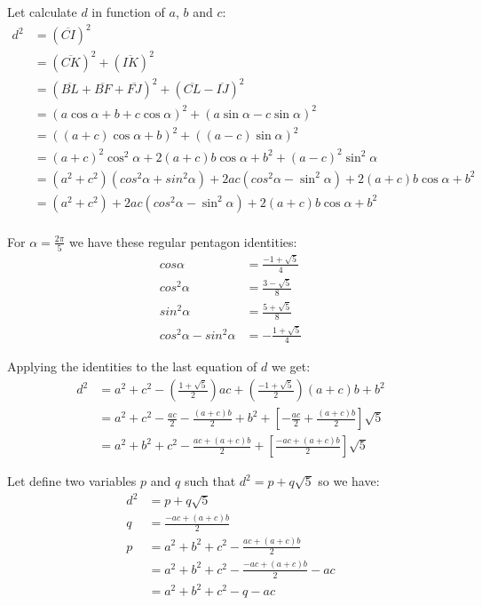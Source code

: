 \documentclass[11pt]{article}
\begin{document}
Let calculate $d$ in function of $a$, $b$ and $c$:
\begin{align*}
d^2 &= (\overline{CI})^2\\
    &= (\overline{CK})^2 + (\overline{IK})^2\\
    &= (\overline{BL} + \overline{BF} + \overline{FJ})^2 + (\overline{CL} - \overline{IJ})^2\\
    &= (a\cos{\alpha} + b + c\cos{\alpha})^2 + (a\sin{\alpha} - c\sin{\alpha})^2\\
    &= ((a+c)\cos{\alpha} + b)^2 + ((a-c)\sin{\alpha})^2\\
    &= (a+c)^2\cos^2{\alpha} + 2(a+c)b\cos{\alpha} + b^2 + (a-c)^2\sin^2{\alpha}\\
    &= (a^2+c^2)(cos^2{\alpha}+sin^2{\alpha}) + 2ac(cos^2{\alpha}-\sin^2{\alpha})+ 2(a+c)b\cos{\alpha} + b^2\\
    &= (a^2+c^2) + 2ac(cos^2{\alpha}-\sin^2{\alpha})+ 2(a+c)b\cos{\alpha} + b^2\\
\end{align*}

For $\alpha = \frac{2\pi}{5}$ we have these regular pentagon identities:
\begin{align*}
cos{\alpha}   &= \frac{-1 + \sqrt{5}}{4} \\
cos^2{\alpha} &= \frac{{ 3 - \sqrt{5}}}{8} \\
sin^2{\alpha} &= \frac{5 + \sqrt{5}}{8} \\
cos^2{\alpha} - sin^2{\alpha} &= -\frac{1 + \sqrt{5}}{4}
\end{align*}

Applying the identities to the last equation of $d$ we get:
\begin{align*}
d^2 &= a^2 + c^2 - (\frac{1 + \sqrt{5}}{2})ac + (\frac{-1 + \sqrt{5}}{2})(a+c)b + b^2\\
    &= a^2 + c^2 - \frac{ac}{2} - \frac{(a+c)b}{2} + b^2 + [- \frac{ac}{2} + \frac{(a+c)b}{2}]\sqrt{5}\\
    &= a^2 + b^2 + c^2 - \frac{ac + (a+c)b}{2} + [\frac{-ac + (a+c)b}{2}]\sqrt{5}
\end{align*}

Let define two variables $p$ and $q$ such that $d^2 = p + q\sqrt{5}$ so we have:
\begin{align*}
d^2 &= p + q\sqrt{5}\\
  q &= \frac{-ac + (a + c)b}{2}\\
  p &= a^2 + b^2 + c^2 - \frac{ac + (a+c)b}{2}\\
    &= a^2 + b^2 + c^2 - \frac{-ac + (a+c)b}{2} - ac\\
    &= a^2 + b^2 + c^2 - q - ac
\end{align*}
\end{document}
